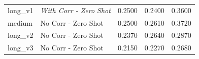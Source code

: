 \documentclass[letterpaper,journal]{IEEEtran}
\begin{document}
\begin{table}[!t]
\begin{tabular}{l|l|l|l|l}
long\_v1          & \textit{With Corr - Zero Shot}            & 0.2500                     & 0.2400                      & 0.3600                    \\
medium            & No Corr - Zero Shot                       & 0.2500                     & 0.2610                      & 0.3720                    \\
long\_v2          & No Corr - Zero Shot                       & 0.2370                     & 0.2640                      & 0.2870                    \\
long\_v3          & No Corr - Zero Shot                       & 0.2150                     & 0.2270                      & 0.2680                   
\end{tabular}
\end{table}
\end{document}
